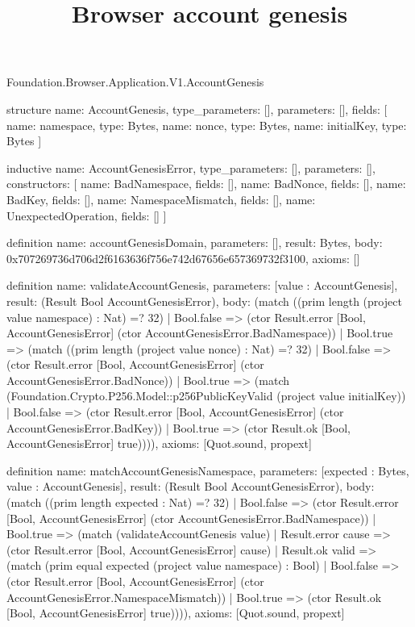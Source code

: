 \begin{lexlean}{Foundation.Browser.Application.V1.AccountGenesis}
\title{Browser account genesis}
\begin{semanticmodule}
structure{
  name: AccountGenesis,
  type_parameters: [],
  parameters: [],
  fields: [
    {name: namespace, type: Bytes},
    {name: nonce, type: Bytes},
    {name: initialKey, type: Bytes}
  ]
}

inductive{
  name: AccountGenesisError,
  type_parameters: [],
  parameters: [],
  constructors: [
    {name: BadNamespace, fields: []},
    {name: BadNonce, fields: []},
    {name: BadKey, fields: []},
    {name: NamespaceMismatch, fields: []},
    {name: UnexpectedOperation, fields: []}
  ]
}

definition{
  name: accountGenesisDomain,
  parameters: [],
  result: Bytes,
  body: 0x707269736d706d2f6163636f756e742d67656e657369732f3100,
  axioms: []
}

definition{
  name: validateAccountGenesis,
  parameters: [value : AccountGenesis],
  result: (Result Bool AccountGenesisError),
  body: (match ((prim length (project value namespace) : Nat) =? 32)
    | Bool.false => (ctor Result.error [Bool, AccountGenesisError] (ctor AccountGenesisError.BadNamespace))
    | Bool.true => (match ((prim length (project value nonce) : Nat) =? 32)
      | Bool.false => (ctor Result.error [Bool, AccountGenesisError] (ctor AccountGenesisError.BadNonce))
      | Bool.true => (match (Foundation.Crypto.P256.Model::p256PublicKeyValid (project value initialKey))
        | Bool.false => (ctor Result.error [Bool, AccountGenesisError] (ctor AccountGenesisError.BadKey))
        | Bool.true => (ctor Result.ok [Bool, AccountGenesisError] true)))),
  axioms: [Quot.sound, propext]
}

definition{
  name: matchAccountGenesisNamespace,
  parameters: [expected : Bytes, value : AccountGenesis],
  result: (Result Bool AccountGenesisError),
  body: (match ((prim length expected : Nat) =? 32)
    | Bool.false => (ctor Result.error [Bool, AccountGenesisError] (ctor AccountGenesisError.BadNamespace))
    | Bool.true => (match (validateAccountGenesis value)
      | Result.error cause => (ctor Result.error [Bool, AccountGenesisError] cause)
      | Result.ok valid => (match (prim equal expected (project value namespace) : Bool)
        | Bool.false => (ctor Result.error [Bool, AccountGenesisError] (ctor AccountGenesisError.NamespaceMismatch))
        | Bool.true => (ctor Result.ok [Bool, AccountGenesisError] true)))),
  axioms: [Quot.sound, propext]
}
\end{semanticmodule}
\end{lexlean}
